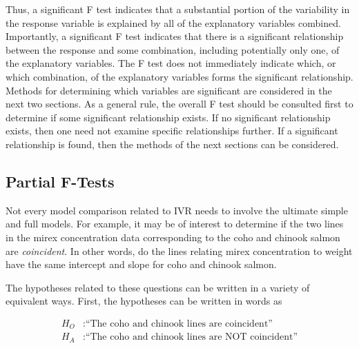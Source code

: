 \documentclass[10pt,openany]{book}\usepackage[]{graphicx}\usepackage[]{color}
\begin{document}

Thus, a significant F test indicates that a substantial portion of the variability in the response variable is explained by all of the explanatory variables combined.  Importantly, a significant F test indicates that there is a significant relationship between the response and some combination, including potentially only one, of the explanatory variables.  The F test does not immediately indicate which, or which combination, of the explanatory variables forms the significant relationship.  Methods for determining which variables are significant are considered in the next two sections.  As a general rule, the overall F test should be consulted first to determine if some significant relationship exists.  If no significant relationship exists, then one need not examine specific relationships further.  If a significant relationship is found, then the methods of the next sections can be considered.


\vspace{-12pt}


\subsection{Partial F-Tests} \label{sect:IVRPartialFTests}
Not every model comparison related to IVR needs to involve the ultimate simple and full models.  For example, it may be of interest to determine if the two lines in the mirex concentration data corresponding to the coho and chinook salmon are \emph{coincident}.  In other words, do the lines relating mirex concentration to weight have the same intercept and slope for coho and chinook salmon.

The hypotheses related to these questions can be written in a variety of equivalent ways.  First, the hypotheses can be written in words as

\[ \begin{split}
  H_{O}&: \text{``The coho and chinook lines are coincident''} \\
  H_{A}&: \text{``The coho and chinook lines are NOT coincident''} \\
\end{split} \]
\end{document}
